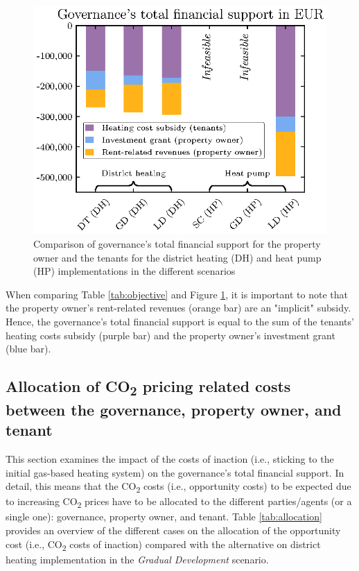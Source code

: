 \begin{figure}[h]
	\centering
	\includegraphics[width=0.7\linewidth]{figures/4_Results/fig_npv_comparison/net_present_value.eps}
	\caption{Comparison of governance's total financial support for the property owner and the tenants for the district heating (DH) and heat pump (HP) implementations in the different scenarios}
	\label{fig:npv_comparison}
\end{figure}

When comparing Table \ref{tab:objective} and Figure \ref{fig:npv_comparison}, it is important to note that the property owner's rent-related revenues (orange bar) are an "implicit" subsidy. Hence, the governance's total financial support is equal to the sum of the tenants' heating costs subsidy (purple bar) and the property owner's investment grant (blue bar). 
\newpage
\subsection{Allocation of CO\textsubscript{2} pricing related costs between the governance, property owner, and tenant}\label{res:co2_shares}
This section examines the impact of the costs of inaction (i.e., sticking to the initial gas-based heating system) on the governance's total financial support. In detail, this means that the CO\textsubscript{2} costs (i.e., opportunity costs) to be expected due to increasing CO\textsubscript{2} prices have to be allocated to the different parties/agents (or a single one): governance, property owner, and tenant. Table \ref{tab:allocation} provides an overview of the different cases on the allocation of the opportunity cost (i.e., CO\textsubscript{2} costs of inaction) compared with the alternative on district heating implementation in the \textit{Gradual Development} scenario.


